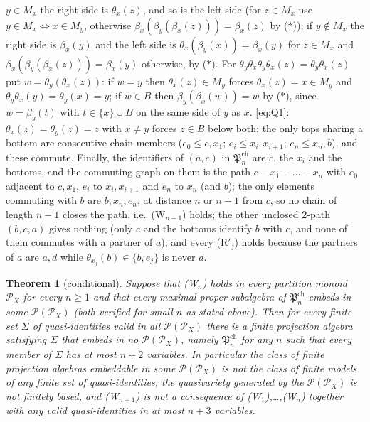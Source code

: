 \documentclass[11pt]{amsart}
\newtheorem{theorem}{Theorem}[section]
\theoremstyle{definition}
\renewcommand{\P}{\mathcal{P}}
\begin{document}
$y\in M_x$ the right side is $\theta_x(z)$, and so is the left side (for $z\in M_x$ use $y\in M_x\Leftrightarrow x\in M_y$, otherwise $\beta_x(\beta_y(\beta_x(z)))=\beta_x(z)$ by ($*$)); if $y\notin M_x$ the right side is $\beta_x(y)$ and the left side is $\theta_x(\beta_y(x))=\beta_x(y)$ for $z\in M_x$ and $\beta_x(\beta_y(\beta_x(z)))=\beta_x(y)$ otherwise, by ($*$). For $\theta_y\theta_x\theta_y\theta_x(z)=\theta_y\theta_x(z)$ put $w=\theta_y(\theta_x(z))$: if $w=y$ then $\theta_x(z)\in M_y$ forces $\theta_x(z)=x\in M_y$ and $\theta_y\theta_x(y)=\theta_y(x)=y$; if $w\in B$ then $\beta_y(\beta_x(w))=w$ by ($*$), since $w=\beta_y(t)$ with $t\in\{x\}\cup B$ on the same side of $y$ as $x$. \eqref{eq:Q1}: $\theta_x(z)=\theta_y(z)=z$ with $x\ne y$ forces $z\in B$ below both; the only tops sharing a bottom are consecutive chain members ($e_0\le c,x_1$; $e_i\le x_i,x_{i+1}$; $e_n\le x_n,b$), and these commute. Finally, the identifiers of $(a,c)$ in $\mathfrak P^{\mathrm{ch}}_n$ are $c$, the $x_i$ and the bottoms, and the commuting graph on them is the path $c-x_1-\dots-x_n$ with $e_0$ adjacent to $c,x_1$, $e_i$ to $x_i,x_{i+1}$ and $e_n$ to $x_n$ (and $b$); the only elements commuting with $b$ are $b,x_n,e_n$, at distance $n$ or $n+1$ from $c$, so no chain of length $n-1$ closes the path, i.e.\ (W$_{n-1}$) holds; the other unclosed 2-path $(b,c,a)$ gives nothing (only $c$ and the bottoms identify $b$ with $c$, and none of them commutes with a partner of $a$); and every (R$'_j$) holds because the partners of $a$ are $a,d$ while $\theta_{x_j}(b)\in\{b,e_j\}$ is never $d$.

\begin{theorem}[conditional]\label{thm:nfb}
Suppose that \textup{(W$_n$)} holds in every partition monoid $\P_X$ for every $n\ge1$ and that every maximal proper subalgebra of $\mathfrak P^{\mathrm{ch}}_n$ embeds in some $\P(\P_X)$ \textup{(}both verified for small $n$ as stated above\textup{)}. Then for every finite set $\Sigma$ of quasi-identities valid in all $\P(\P_X)$ there is a finite projection algebra satisfying $\Sigma$ that embeds in no $\P(\P_X)$, namely $\mathfrak P^{\mathrm{ch}}_n$ for any $n$ such that every member of $\Sigma$ has at most $n+2$ variables. In particular the class of finite projection algebras embeddable in some $\P(\P_X)$ is not the class of finite models of any finite set of quasi-identities, the quasivariety generated by the $\P(\P_X)$ is not finitely based, and \textup{(W$_{n+1}$)} is not a consequence of \textup{(W$_1$)},\dots,\textup{(W$_n$)} together with any valid quasi-identities in at most $n+3$ variables.
\end{theorem}
\end{document}
